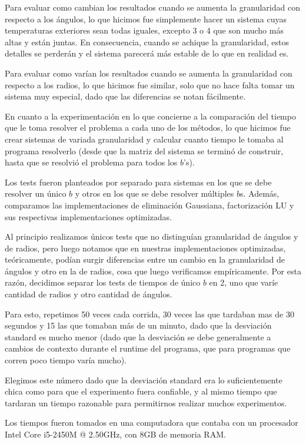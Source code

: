 Para evaluar como cambian los resultados cuando se aumenta la granularidad con respecto a los ángulos, lo que hicimos fue simplemente hacer un sistema cuyas temperaturas exteriores sean todas iguales, excepto 3 o 4 que son mucho más altas y están juntas. En consecuencia, cuando se achique la granularidad, estos detalles se perderán y el sistema parecerá más estable de lo que en realidad es.

Para evaluar como varían los resultados cuando se aumenta la granularidad con respecto a los radios, lo que hicimos fue similar, solo que no hace falta tomar un sistema muy especial, dado que las diferencias se notan fácilmente.

En cuanto a la experimentación en lo que concierne a la comparación del tiempo que le toma resolver el problema a cada uno de los métodos, lo que hicimos fue crear sistemas de variada granularidad y calcular cuanto tiempo le tomaba al programa resolverlo (desde que la matriz del sistema se terminó de construir, hasta que se resolvió el problema para todos los $b$'s).

Los tests fueron planteados por separado para sistemas en los que se debe resolver un único $b$ y otros en los que se debe resolver múltiples $b$s. Además, comparamos las implementaciones de eliminación Gaussiana, factorización LU y sus respectivas implementaciones optimizadas.

Al principio realizamos únicos tests que no distinguían granularidad de ángulos y de radios, pero luego notamos que en nuestras implementaciones optimizadas, teóricamente, podían surgir diferencias entre un cambio en la granularidad de ángulos y otro en la de radios, cosa que luego verificamos empíricamente. Por esta razón, decidimos separar los tests de tiempos de único $b$ en 2, uno que varíe cantidad de radios y otro cantidad de ángulos.


Para esto, repetimos 50 veces cada corrida, 30 veces las que tardaban mas de 30 segundos y 15 las que tomaban más de un minuto, dado que la desviación standard es mucho menor (dado que la desviación se debe generalmente a cambios de contexto durante el runtime del programa, que para programas que corren poco tiempo varía mucho).

Elegimos este número dado que la desviación standard era lo suficientemente chica como para que el experimento fuera confiable, y al mismo tiempo que tardaran un tiempo razonable para permitirnos realizar muchos experimentos.

Los tiempos fueron tomados en una computadora que contaba con un procesador Intel Core i5-2450M @ 2.50GHz, con 8GB de memoria RAM.
